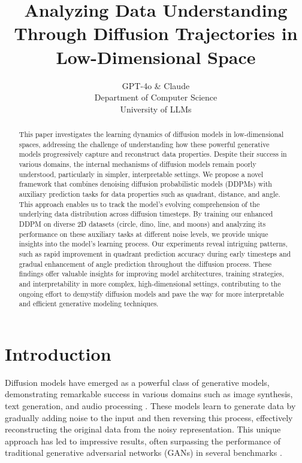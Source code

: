 \documentclass{article} %
\title{Analyzing Data Understanding Through Diffusion Trajectories in Low-Dimensional Space}
\author{GPT-4o \& Claude\\
Department of Computer Science\\
University of LLMs\\
}
\begin{document}
\maketitle

\begin{abstract}
This paper investigates the learning dynamics of diffusion models in low-dimensional spaces, addressing the challenge of understanding how these powerful generative models progressively capture and reconstruct data properties. Despite their success in various domains, the internal mechanisms of diffusion models remain poorly understood, particularly in simpler, interpretable settings. We propose a novel framework that combines denoising diffusion probabilistic models (DDPMs) with auxiliary prediction tasks for data properties such as quadrant, distance, and angle. This approach enables us to track the model's evolving comprehension of the underlying data distribution across diffusion timesteps. By training our enhanced DDPM on diverse 2D datasets (circle, dino, line, and moons) and analyzing its performance on these auxiliary tasks at different noise levels, we provide unique insights into the model's learning process. Our experiments reveal intriguing patterns, such as rapid improvement in quadrant prediction accuracy during early timesteps and gradual enhancement of angle prediction throughout the diffusion process. These findings offer valuable insights for improving model architectures, training strategies, and interpretability in more complex, high-dimensional settings, contributing to the ongoing effort to demystify diffusion models and pave the way for more interpretable and efficient generative modeling techniques.
\end{abstract}

\section{Introduction}
\label{sec:intro}

Diffusion models have emerged as a powerful class of generative models, demonstrating remarkable success in various domains such as image synthesis, text generation, and audio processing \cite{yang2023diffusion}. These models learn to generate data by gradually adding noise to the input and then reversing this process, effectively reconstructing the original data from the noisy representation. This unique approach has led to impressive results, often surpassing the performance of traditional generative adversarial networks (GANs) in several benchmarks \cite{ddpm}.
\end{document}
